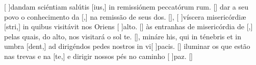 {  %
  {[ ]{dan}dam sciéntiam salútis [ius,] in remissiónem peccatórum rum. [\LinkLA]}%
    { dar a seu povo o conhecimento da [,] na remissão de seus dos. [\LinkPT]},
  {[ ]{ví}scera misericórdiæ [stri,] in quibus visitávit nos Oriens [ ]{al}to. [\LinkLA]}%
    { às entranhas de misericórdia de [,] pelas quais, do alto, nos visitará o sol te. [\LinkPT]},
  {mináre his, qui in ténebris et in umbra [dent,] ad dirigéndos pedes nostros in vi[ ]{pa}cis. [\LinkLA]}%
    { iluminar os que estão nas trevas e na [te,] e dirigir nossos pés no caminho [ ]{paz}. [\LinkPT]}
}
